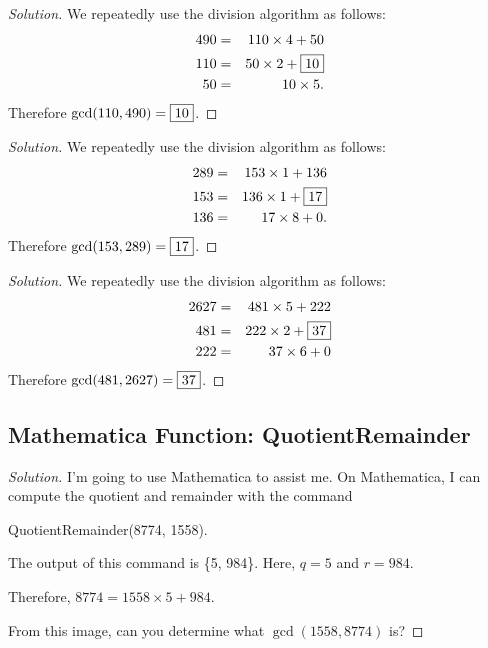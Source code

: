 \begin{proof}[Solution]
	 We repeatedly use the division algorithm as follows: 
	 \begin{eqnarray*} 490&=&110\times 4+50 \\ 110&=&50\times 2+\framebox{10} \\ 50&=&10\times 5.\end{eqnarray*} 
Therefore $\gcd(110, 490)=\framebox{10}$.  \end{proof} 

\clearpage


\begin{proof}[Solution]
	We repeatedly use the division algorithm as follows:
		\begin{eqnarray*}  289 &=& 153\times 1+136 \\ 153 &=& 136\times 1+\framebox{17} \\ 136&=& 17\times 8+0. \end{eqnarray*}
Therefore $\gcd(153, 289)=\framebox{17}$.  \end{proof}

\clearpage


\begin{proof}[Solution]
We repeatedly use the division algorithm as follows: 
	\begin{eqnarray*}  
	2627 &=& 481\times 5+222 \\
	481 &=& 222\times 2+\framebox{37} \\
	222 &=& 37\times 6+0 
	\end{eqnarray*}
Therefore $\gcd(481, 2627)=\framebox{37}$. 
\end{proof}

\clearpage

\subsection{Mathematica Function: QuotientRemainder}


\begin{proof}[Solution]
	
I'm going to use Mathematica to assist me. On Mathematica, I can compute the quotient and remainder with the command \begin{center} QuotientRemainder(8774, 1558). \end{center}

The output of this command is \{5, 984\}. Here, $q=5$ and $r=984$.  

Therefore, $8774=1558\times 5+984.$

\clearpage

From this image, can you determine what $\gcd(1558, 8774)$ is? \end{proof}


